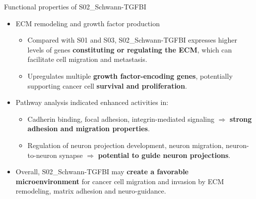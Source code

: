 \documentclass[10pt]{beamer}
\theoremstyle{plain}
\begin{document}
\begin{frame}{Functional properties of S02\_Schwann-TGFBI}
  \begin{itemize}
    \item ECM remodeling and growth factor production
      \begin{itemize}
        \item Compared with S01 and S03, S02\_Schwann-TGFBI expresses higher levels of genes
              \textbf{constituting or regulating the ECM}, which can facilitate cell migration and metastasis.
        \item Upregulates multiple \textbf{growth factor-encoding genes}, potentially supporting
              cancer cell \textbf{survival and proliferation}.
      \end{itemize}

    \item Pathway analysis indicated enhanced activities in:
        \begin{itemize}
          \item Cadherin binding, focal adhesion, integrin-mediated signaling 
                \(\Rightarrow\) \textbf{strong adhesion and migration properties}.
          \item Regulation of neuron projection development, neuron migration, neuron-to-neuron synapse
                \(\Rightarrow\) \textbf{potential to guide neuron projections}.
        \end{itemize}
      \item Overall, S02\_Schwann-TGFBI may \textbf{create a favorable microenvironment} for cancer cell migration and invasion by ECM remodeling, matrix adhesion and neuro-guidance.
  \end{itemize}
\end{frame}
\end{document}
